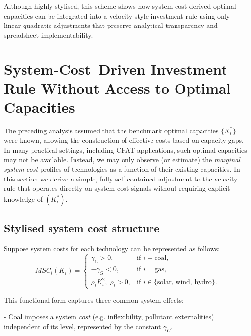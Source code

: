 \documentclass[preprint,authoryear,12pt]{elsarticle}
\begin{document}
Although highly stylised, this scheme shows how system-cost-derived optimal capacities can be
integrated into a velocity-style investment rule using only linear-quadratic adjustments that
preserve analytical transparency and spreadsheet implementability.


\section{System-Cost–Driven Investment Rule Without Access to Optimal Capacities}

The preceding analysis assumed that the benchmark optimal capacities $\{K_i^*\}$ were known,
allowing the construction of effective costs based on capacity gaps. In many practical settings, 
including CPAT applications, such optimal capacities may not be available. Instead, we may only
observe (or estimate) the \emph{marginal system cost} profiles of technologies as a function of
their existing capacities. In this section we derive a simple, fully self-contained adjustment to the
velocity rule that operates directly on system cost signals without requiring explicit knowledge of
$(K_i^*)$.

\subsection*{Stylised system cost structure}

Suppose system costs for each technology can be represented as follows:
\begin{equation}
    MSC_i(K_i)
    =
    \begin{cases}
        \gamma_C > 0,                      & \text{if } i = \text{coal}, \\[6pt]
        -\gamma_G < 0,                     & \text{if } i = \text{gas},  \\[6pt]
        \rho_i K_i^2, \;\rho_i > 0,        & \text{if } i \in \{\text{solar, wind, hydro}\}.
    \end{cases}
    \label{eq:stylised_MSCs}
\end{equation}

This functional form captures three common system effects:

- Coal imposes a system \emph{cost} (e.g. inflexibility, pollutant externalities) independent of its
  level, represented by the constant $\gamma_C$.
\end{document}
